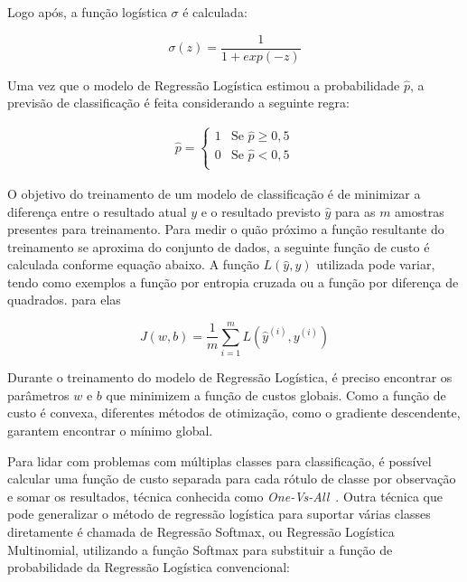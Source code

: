 \documentclass[portugues]{ic-tese}
\begin{document}
Logo após, a função logística $\sigma$ é calculada:

\begin{equation}
\sigma (z) = \frac{1}{1 + exp(-z)}
\end{equation}

Uma vez que o modelo de Regressão Logística estimou a probabilidade $\hat{p}$, a previsão de classificação é feita considerando a seguinte regra:

\begin{equation}
	\begin{aligned}
	\hat{p} = 
	\begin{cases}
	1 & \text{Se $\hat{p} \geqslant 0,5$}\\
	0 & \text{Se $\hat{p} < 0,5$}\\
	\end{cases}
	\end{aligned}
\end{equation}

O objetivo do treinamento de um modelo de classificação é de minimizar a diferença entre o resultado atual $y$ e o resultado previsto $\hat{y}$ para as $m$ amostras presentes para treinamento. Para medir o quão próximo a função resultante do treinamento se aproxima do conjunto de dados, a seguinte função de custo é calculada conforme equação abaixo. A função $L(\hat{y}, y)$ utilizada pode variar, tendo como exemplos a função por entropia cruzada ou a função por diferença de quadrados.
para elas

\begin{equation}
J(w,b) = \frac{1}{m} \sum^{m}_{i=1} L(\hat{y}^{(i)}, y^{(i)})
\end{equation}

Durante o treinamento do modelo de Regressão Logística, é preciso encontrar os parâmetros $w$ e $b$ que minimizem a função de custos globais. Como a função de custo é convexa, diferentes métodos de otimização, como o gradiente descendente, garantem encontrar o mínimo global.

Para lidar com problemas com múltiplas classes para classificação, é possível calcular uma função de custo separada para cada rótulo de classe por observação e somar os resultados, técnica conhecida como \textit{One-Vs-All}~\citep{Rifkin_2004}. Outra técnica que pode generalizar o método de regressão logística para suportar várias classes diretamente é chamada de Regressão Softmax, ou Regressão Logística Multinomial, utilizando a função Softmax para substituir a função de probabilidade da Regressão Logística convencional:
\end{document}
